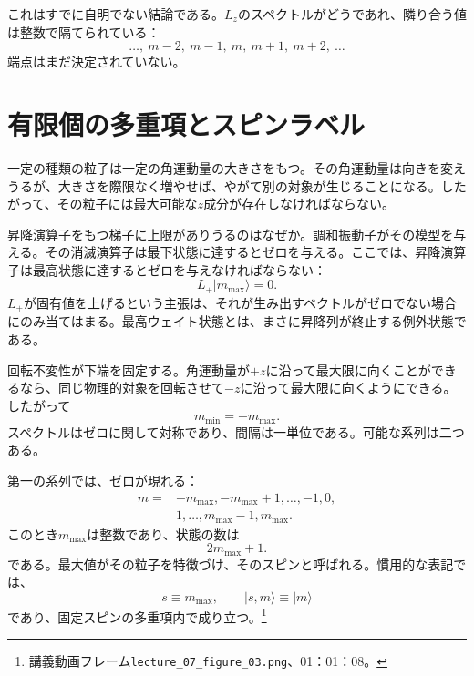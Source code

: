 これはすでに自明でない結論である。\(L_z\)のスペクトルがどうであれ、隣り合う値は整数で隔てられている：
\begin{equation}
\ldots,\ m-2,\ m-1,\ m,\ m+1,\ m+2,\ \ldots
\end{equation}
端点はまだ決定されていない。

\section{有限個の多重項とスピンラベル}

一定の種類の粒子は一定の角運動量の大きさをもつ。その角運動量は向きを変えうるが、大きさを際限なく増やせば、やがて別の対象が生じることになる。したがって、その粒子には最大可能な\(z\)成分が存在しなければならない。

昇降演算子をもつ梯子に上限がありうるのはなぜか。調和振動子がその模型を与える。その消滅演算子は最下状態に達するとゼロを与える。ここでは、昇降演算子は最高状態に達するとゼロを与えなければならない：
\begin{equation}
L_+\lvert m_{\max}\rangle=0.
\end{equation}
\(L_+\)が固有値を上げるという主張は、それが生み出すベクトルがゼロでない場合にのみ当てはまる。最高ウェイト状態とは、まさに昇降列が終止する例外状態である。

回転不変性が下端を固定する。角運動量が\(+z\)に沿って最大限に向くことができるなら、同じ物理的対象を回転させて\(-z\)に沿って最大限に向くようにできる。したがって
\begin{equation}
m_{\min}=-m_{\max}.
\end{equation}
スペクトルはゼロに関して対称であり、間隔は一単位である。可能な系列は二つある。

第一の系列では、ゼロが現れる：
\begin{equation}
\begin{aligned}
m={}&-m_{\max},-m_{\max}+1,\ldots,-1,0,\\
&1,\ldots,m_{\max}-1,m_{\max}.
\end{aligned}
\end{equation}
このとき\(m_{\max}\)は整数であり、状態の数は
\begin{equation}
2m_{\max}+1.
\end{equation}
である。最大値がその粒子を特徴づけ、そのスピンと呼ばれる。慣用的な表記では、
\begin{equation}
s\equiv m_{\max},
\qquad
\lvert s,m\rangle\equiv\lvert m\rangle
\end{equation}
であり、固定スピンの多重項内で成り立つ。\footnote{\raggedright 講義動画フレーム\nolinkurl{lecture_07_figure_03.png}、01：01：08。\par}

